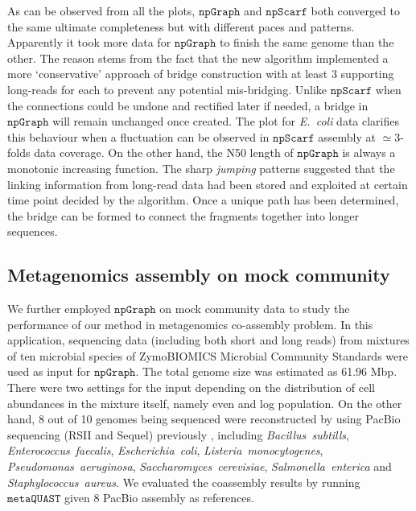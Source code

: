 \documentclass[10pt,twocolumn,twoside]{genpaper}
\newcommand{\npscarf}{$\mathtt{npScarf}$}
\newcommand{\npgraph}{$\mathtt{npGraph}$}
\newcommand{\ec}{\emph{E.~coli}}
\begin{document}
As can be observed from all the plots, \npgraph{} and \npscarf{} both converged to the same ultimate completeness but with different paces and patterns.
Apparently it took more data for \npgraph{} to finish the same genome than the other.
The reason stems from the fact that the new algorithm implemented a more `conservative' approach of bridge construction with at least 3 supporting long-reads for each to prevent any potential mis-bridging. 
Unlike \npscarf{} when the connections could be undone and rectified later if needed, a bridge in \npgraph{} will remain unchanged once created.
The plot for \ec{} data clarifies this behaviour when a fluctuation can be observed in \npscarf{} assembly at $\simeq 3$-folds data coverage.
On the other hand, the N50 length of \npgraph{} is always a monotonic increasing function. 
The sharp \emph{jumping} patterns suggested that the linking information from long-read data had been stored and exploited at certain time point decided by the algorithm.
Once a unique path has been determined, the bridge can be formed to connect the fragments together into longer sequences.

\subsection*{Metagenomics assembly on mock community}
We further employed \npgraph{} on mock community data to study the performance of our method in metagenomics co-assembly problem.
In this application, sequencing data (including both short and long reads) from mixtures of ten microbial species of ZymoBIOMICS Microbial Community Standards \cite{Nick2019zymo} were used as input for \npgraph{}. 
The total genome size was estimated as 61.96 Mbp.
There were two settings for the input depending on the distribution of cell abundances in the mixture itself, namely even and log population.
On the other hand, 8 out of 10 genomes being sequenced were reconstructed by using PacBio sequencing (RSII and Sequel) previously \cite{Mcintyre2019zymo}, including \emph{Bacillus~subtills}, \emph{Enterococcus~faecalis}, \emph{Escherichia~coli}, \emph{Listeria~monocytogenes}, \emph{Pseudomonas~aeruginosa}, \emph{Saccharomyces~cerevisiae}, \emph{Salmonella~enterica} and \emph{Staphylococcus~aureus}. We evaluated the coassembly results by running $\mathtt{metaQUAST}$ given 8 PacBio assembly as references.
\end{document}
